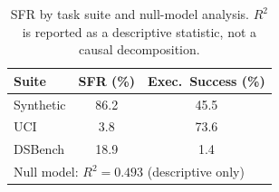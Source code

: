 \begin{table}[t]
\centering
\caption{SFR by task suite and null-model analysis. $R^2$ is reported as a descriptive statistic, not a causal decomposition.}
\label{tab:null-model}
\small
\begin{tabular}{@{}lcc@{}}
\toprule
Suite & SFR (\%) & Exec.\ Success (\%) \\
\midrule
Synthetic & 86.2 & 45.5 \\
UCI & 3.8 & 73.6 \\
DSBench & 18.9 & 1.4 \\
\midrule
\multicolumn{3}{l}{Null model: $R^2 = 0.493$ (descriptive only)} \\
\bottomrule
\end{tabular}
\end{table}
